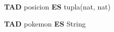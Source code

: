 \newcommand{\renombre}[2]{\textbf{TAD} {#1} \textbf{ES} {#2}}

\renombre{posicion}{tupla(nat, nat)}

\renombre{pokemon}{String}